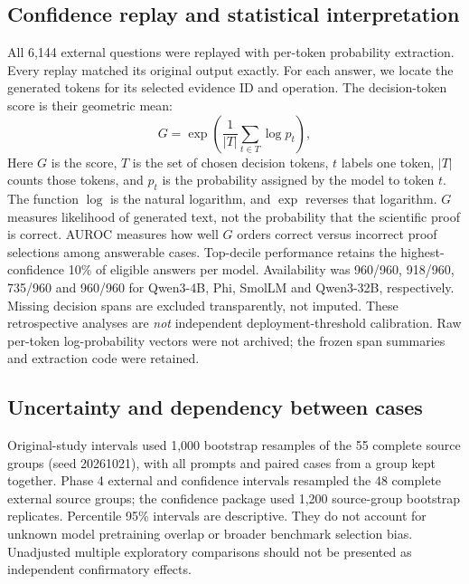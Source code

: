 \documentclass[11pt]{article}
\begin{document}
\subsection{Confidence replay and statistical interpretation}
All 6,144 external questions were replayed with per-token probability extraction. Every replay matched its original output exactly. For each answer, we locate the generated tokens for its selected evidence ID and operation. The decision-token score is their geometric mean:
\begin{equation}
 G=\exp\!\left(\frac{1}{|T|}\sum_{t\in T}\log p_t\right),
\end{equation}
Here $G$ is the score, $T$ is the set of chosen decision tokens, $t$ labels one token, $|T|$ counts those tokens, and $p_t$ is the probability assigned by the model to token $t$. The function $\log$ is the natural logarithm, and $\exp$ reverses that logarithm. $G$ measures likelihood of generated text, not the probability that the scientific proof is correct. AUROC measures how well $G$ orders correct versus incorrect proof selections among answerable cases. Top-decile performance retains the highest-confidence 10\% of eligible answers per model. Availability was 960/960, 918/960, 735/960 and 960/960 for Qwen3-4B, Phi, SmolLM and Qwen3-32B, respectively. Missing decision spans are excluded transparently, not imputed. These retrospective analyses are \emph{not} independent deployment-threshold calibration. Raw per-token log-probability vectors were not archived; the frozen span summaries and extraction code were retained.

\subsection{Uncertainty and dependency between cases}
Original-study intervals used 1,000 bootstrap resamples of the 55 complete source groups (seed 20261021), with all prompts and paired cases from a group kept together. Phase 4 external and confidence intervals resampled the 48 complete external source groups; the confidence package used 1,200 source-group bootstrap replicates. Percentile 95\% intervals are descriptive. They do not account for unknown model pretraining overlap or broader benchmark selection bias. Unadjusted multiple exploratory comparisons should not be presented as independent confirmatory effects.
\end{document}
